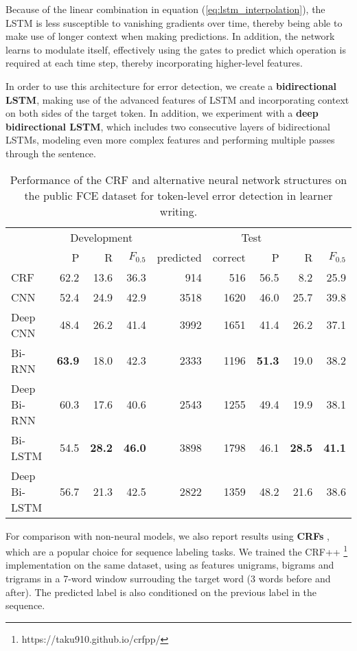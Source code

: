 \documentclass[11pt]{article}
\begin{document}
Because of the linear combination in equation (\ref{eq:lstm_interpolation}), the LSTM is less susceptible to vanishing gradients over time, thereby being able to make use of longer context when making predictions. In addition, the network learns to modulate itself, effectively using the gates to predict which operation is required at each time step, thereby incorporating higher-level features.

In order to use this architecture for error detection, we create a \textbf{bidirectional LSTM}, making use of the advanced features of LSTM and incorporating context on both sides of the target token. In addition, we experiment with a \textbf{deep bidirectional LSTM}, which includes two consecutive layers of bidirectional LSTMs, modeling even more complex features and performing multiple passes through the sentence.




\begin{table*}
\setlength\tabcolsep{11.0pt}
\begin{tabular}{lrrr|rrrrr} \toprule
 & \multicolumn{3}{c|}{Development}  & \multicolumn{5}{c}{Test} \\
 & P & R & $F_{0.5}$ & predicted & correct & P & R & $F_{0.5}$ \\ \midrule
CRF & 62.2 & 13.6 & 36.3 & 914 & 516 & 56.5 & 8.2 & 25.9 \\ \midrule
CNN & 52.4 & 24.9 & 42.9 & 3518 & 1620 & 46.0 & 25.7 & 39.8 \\
Deep CNN & 48.4 & 26.2 & 41.4 & 3992 & 1651 & 41.4 & 26.2 & 37.1 \\
Bi-RNN & \textbf{63.9} & 18.0 & 42.3 & 2333 & 1196 & \textbf{51.3} & 19.0 & 38.2 \\
Deep Bi-RNN & 60.3 & 17.6 & 40.6 & 2543 & 1255 & 49.4 & 19.9 & 38.1 \\
Bi-LSTM & 54.5 & \textbf{28.2} & \textbf{46.0} & 3898 & 1798 & 46.1 & \textbf{28.5} & \textbf{41.1} \\
Deep Bi-LSTM & 56.7 & 21.3 & 42.5 & 2822 & 1359 & 48.2 & 21.6 & 38.6 \\ \bottomrule
\end{tabular}
\caption{Performance of the CRF and alternative neural network structures on the public FCE dataset for token-level error detection in learner writing.}
\label{tab:structure}
\end{table*}


For comparison with non-neural models, we also report results using \textbf{CRFs} \cite{Lafferty2001}, which are a popular choice for sequence labeling tasks. We trained the CRF++ \footnote{https://taku910.github.io/crfpp/} implementation on the same dataset, using as features unigrams, bigrams and trigrams in a 7-word window surrouding the target word (3 words before and after). The predicted label is also conditioned on the previous label in the sequence.
\end{document}
